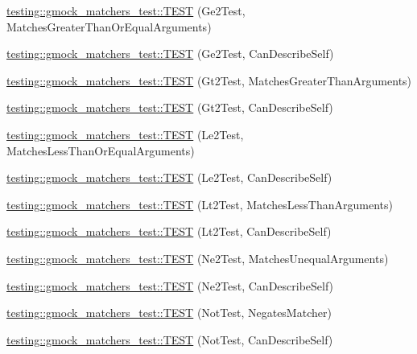 \begin{DoxyCompactItemize}
\item 
\hyperlink{namespacetesting_1_1gmock__matchers__test_a100bae52c11f2e44a141652002d3bee2}{testing\+::gmock\+\_\+matchers\+\_\+test\+::\+T\+E\+ST} (Ge2\+Test, Matches\+Greater\+Than\+Or\+Equal\+Arguments)
\item 
\hyperlink{namespacetesting_1_1gmock__matchers__test_aaee5baf487e6234d1d8b6779b70a15c0}{testing\+::gmock\+\_\+matchers\+\_\+test\+::\+T\+E\+ST} (Ge2\+Test, Can\+Describe\+Self)
\item 
\hyperlink{namespacetesting_1_1gmock__matchers__test_a4ef0cb0e88b7801075798649189d7b72}{testing\+::gmock\+\_\+matchers\+\_\+test\+::\+T\+E\+ST} (Gt2\+Test, Matches\+Greater\+Than\+Arguments)
\item 
\hyperlink{namespacetesting_1_1gmock__matchers__test_ae7351eb01d03897324b2fe03045f2c10}{testing\+::gmock\+\_\+matchers\+\_\+test\+::\+T\+E\+ST} (Gt2\+Test, Can\+Describe\+Self)
\item 
\hyperlink{namespacetesting_1_1gmock__matchers__test_add304ba60989990fc78a616c9592a948}{testing\+::gmock\+\_\+matchers\+\_\+test\+::\+T\+E\+ST} (Le2\+Test, Matches\+Less\+Than\+Or\+Equal\+Arguments)
\item 
\hyperlink{namespacetesting_1_1gmock__matchers__test_a75d0bbfa66d404aa458f0739297c9edc}{testing\+::gmock\+\_\+matchers\+\_\+test\+::\+T\+E\+ST} (Le2\+Test, Can\+Describe\+Self)
\item 
\hyperlink{namespacetesting_1_1gmock__matchers__test_ac7ecdd71d0cc49438f7ad1863fdfab05}{testing\+::gmock\+\_\+matchers\+\_\+test\+::\+T\+E\+ST} (Lt2\+Test, Matches\+Less\+Than\+Arguments)
\item 
\hyperlink{namespacetesting_1_1gmock__matchers__test_a9f557c4688b2907704650cc18cfd9dcf}{testing\+::gmock\+\_\+matchers\+\_\+test\+::\+T\+E\+ST} (Lt2\+Test, Can\+Describe\+Self)
\item 
\hyperlink{namespacetesting_1_1gmock__matchers__test_a69692057d2825f6fc8a37265667867c7}{testing\+::gmock\+\_\+matchers\+\_\+test\+::\+T\+E\+ST} (Ne2\+Test, Matches\+Unequal\+Arguments)
\item 
\hyperlink{namespacetesting_1_1gmock__matchers__test_acedf2eda13385067ee70bdb7d6073427}{testing\+::gmock\+\_\+matchers\+\_\+test\+::\+T\+E\+ST} (Ne2\+Test, Can\+Describe\+Self)
\item 
\hyperlink{namespacetesting_1_1gmock__matchers__test_ab41b57eeaea5568064b6ed3725316c73}{testing\+::gmock\+\_\+matchers\+\_\+test\+::\+T\+E\+ST} (Not\+Test, Negates\+Matcher)
\item 
\hyperlink{namespacetesting_1_1gmock__matchers__test_a831db2bf90c3950953cdceaefebddd40}{testing\+::gmock\+\_\+matchers\+\_\+test\+::\+T\+E\+ST} (Not\+Test, Can\+Describe\+Self)

\end{DoxyCompactItemize}
